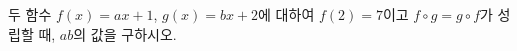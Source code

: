 \hspace*{2mm}\begin{minipage}[t]{\dimexpr\linewidth-2mm\relax}\vspace{0pt}
두 함수 $f(x)=ax+1$, $g(x)=bx+2$에 대하여 $f(2)=7$이고 $f\circ g=g\circ f$가 성립할 때, $ab$의 값을 구하시오. \end{minipage}
